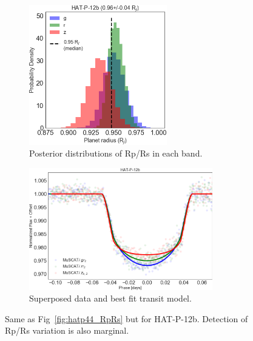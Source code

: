 \begin{figure}
\centering
\begin{subfigure}{.5\textwidth}
	\includegraphics[width=6cm]{hatp12/radius_ratios_Rjup.png}
    \caption{Posterior distributions of Rp/Rs in each band.}
\end{subfigure}%
\begin{subfigure}{.5\textwidth}
	\includegraphics[width=8cm]{hatp12/grz_multi_stacked.png}
    \caption{Superposed data and best fit transit model.}
    \label{fig:hatp12_stacked}
\end{subfigure}
\caption{Same as Fig~\ref{fig:hatp44_RpRs} but for HAT-P-12b. Detection of Rp/Rs variation is also marginal.}
\label{fig:hatp12_RpRs}
\end{figure}


